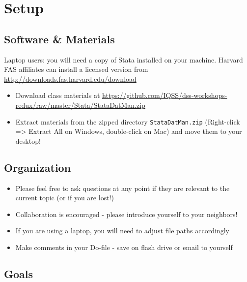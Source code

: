 \documentclass[]{book}
\providecommand{\tightlist}{%
  \setlength{\itemsep}{0pt}\setlength{\parskip}{0pt}}
\begin{document}
\section{Setup}\label{setup-7}

\subsection{Software \& Materials}\label{software-materials-7}

Laptop users: you will need a copy of Stata installed on your machine.
Harvard FAS affiliates can install a licensed version from
\url{http://downloads.fas.harvard.edu/download}

\begin{itemize}
\tightlist
\item
  Download class materials at
  \url{https://github.com/IQSS/dss-workshops-redux/raw/master/Stata/StataDatMan.zip}
\item
  Extract materials from the zipped directory \texttt{StataDatMan.zip}
  (Right-click =\textgreater{} Extract All on Windows, double-click on
  Mac) and move them to your desktop!
\end{itemize}

\subsection{Organization}\label{organization-1}

\begin{itemize}
\tightlist
\item
  Please feel free to ask questions at any point if they are relevant to
  the current topic (or if you are lost!)
\item
  Collaboration is encouraged - please introduce yourself to your
  neighbors!
\item
  If you are using a laptop, you will need to adjust file paths
  accordingly
\item
  Make comments in your Do-file - save on flash drive or email to
  yourself
\end{itemize}

\subsection{Goals}\label{goals-6}
\end{document}
